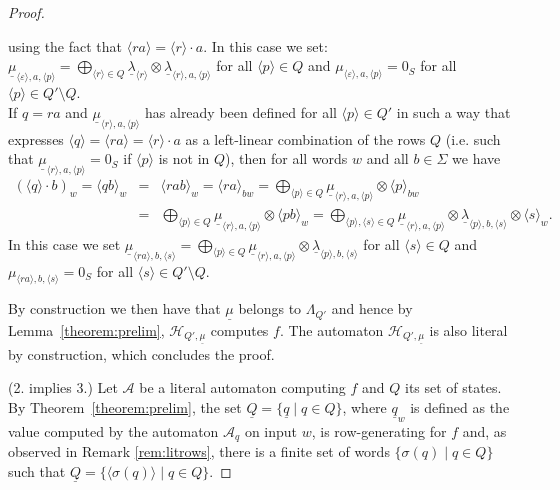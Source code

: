 \documentclass[10pt,a4paper]{amsart}
\theoremstyle{definition}
\numberwithin{equation}{section}
\numberwithin{theorem}{section}
\begin{document}
\begin{proof}
\begin{itemize}
using the fact that $\langle r a \rangle = \langle r \rangle \cdot a$. In this case we set: $\underline{\mu}_{\langle \varepsilon \rangle,a,\langle p \rangle} = \bigoplus_{\langle r \rangle \in Q} \underline{\lambda}_{\langle r \rangle} \otimes \underline{\lambda}_{\langle{r} \rangle,a,\langle p\rangle}$ for all $\langle p \rangle \in Q$ and $\mu_{\langle \varepsilon \rangle ,a, \langle p \rangle } = 0_S$ for all $\langle p \rangle \in Q' \setminus Q$.\\
        If $q = ra$ and $\underline{\mu}_{\langle r \rangle ,a,\langle p \rangle}$ has already been defined for all $\langle p \rangle \in Q'$ in such a way that expresses $\langle q \rangle = \langle ra \rangle = \langle r \rangle \cdot a$ as a left-linear combination of the rows $Q$ (i.e. such that $\underline{\mu}_{\langle r \rangle,a,\langle p \rangle}=0_S$ if $\langle p \rangle$ is not in $Q$), then for all words $w$ and all $ b\in \Sigma$ we have 
		\begin{eqnarray*}(\langle q \rangle \cdot b)_w = \langle qb \rangle_w &=& \langle rab \rangle_w = \langle ra \rangle_{bw} =  \bigoplus_{\langle p  \rangle \in Q} \underline{\mu}_{\langle r \rangle ,a,\langle p\rangle}\otimes \langle p \rangle_{bw}\\
			&=& \bigoplus_{\langle p  \rangle \in Q} \underline{\mu}_{\langle r \rangle ,a,\langle p\rangle} \otimes \langle pb \rangle_{w} = \bigoplus_{\langle p \rangle,\langle s \rangle \in Q} \underline{\mu}_{\langle r \rangle ,a,\langle p\rangle} \otimes \underline{\lambda}_{\langle p \rangle ,b, \langle s\rangle} \otimes \langle s \rangle_{w}.\end{eqnarray*}
		In this case we set $\underline{\mu}_{\langle ra \rangle ,b,\langle s\rangle} = \bigoplus_{\langle p \rangle \in Q} \underline{\mu}_{\langle r \rangle,a,\langle p\rangle} \otimes \underline{\lambda}_{\langle p\rangle ,b,\langle s\rangle }$ for all $\langle s \rangle \in Q$ and $\mu_{\langle ra \rangle ,b,\langle s\rangle} = 0_S$ for all $\langle s \rangle \in Q' \setminus Q$.
	\end{itemize}
By construction we then have that $\underline{\mu}$ belongs to $\Lambda_{Q'}$ and hence by Lemma~\ref{theorem:prelim}, $\mathcal{H}_{Q',\underline{\mu}}$ computes $f$. The automaton $\mathcal{H}_{Q',\underline{\mu}}$ is also literal by construction, which concludes the proof.
	
(2. implies 3.) Let $\mathcal{A}$ be a literal automaton computing $f$ and $Q$ its set of states. By Theorem~\ref{theorem:prelim}, the set $\underline{Q}=\{\underline{q}  \mid q \in Q\}$, where $\underline{q}_w$ is defined as the value computed by the automaton $\mathcal{A}_q$ on input $w$, is row-generating for $f$ and, as observed in Remark \ref{rem:litrows}, there is a finite set of words $\{\sigma(q) \mid q \in Q\}$ such that $\underline{Q} = \{\langle\sigma(q) \rangle \mid q \in Q\}$. 
	

\end{proof}
\end{document}
